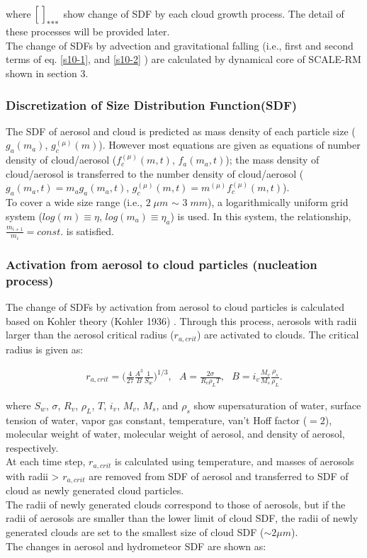where $\Bigl[\;\Bigr]_{***}$ show change of SDF by each cloud growth process. The detail of these processes will be provided later.\\
 The change of SDFs by advection and gravitational falling (i.e., first and second terms of eq. \ref{s10-1}, and \ref{s10-2}  ) are calculated by dynamical core of SCALE-RM shown in section 3.


\subsubsection{Discretization of Size Distribution Function(SDF)}
The SDF of aerosol and cloud is predicted as mass density of each particle size ($g_{a}(m_{a})$, $g_{c}^{(\mu)}(m)$). However most equations are given as equations of number density of cloud/aerosol ($f_{c}^{(\mu)}(m,t)$, $f_{a}(m_{a},t)$); the mass density of cloud/aerosol is transferred to the number density of cloud/aerosol ($g_{a}(m_{a},t)=m_{a}g_{a}(m_{a},t)$, $g_{c}^{(\mu)}(m,t)=m^{(\mu)}f_{c}^{(\mu)}(m,t)$).\\
To cover a wide size range (i.e., $2\;\mu m$ $\sim$ $3\;mm$), a logarithmically uniform grid system ($log(m)\equiv \eta$, $log(m_{a})\equiv \eta_{a}$) is used. In this system, the relationship, $\frac{m_{i+1}}{m_{i}}=const.$ is satisfied.

\subsubsection{Activation from aerosol to cloud particles (nucleation process)}
The change of SDFs by activation from aerosol to cloud particles is calculated based on Kohler theory (Kohler 1936) \cite{kohler_1936}. Through this process, aerosols with radii larger than the aerosol critical radius ($r_{a,crit}$) are activated to clouds. The critical radius is given as:

\begin{eqnarray}
r_{a,crit}=\bigl( \frac{4}{27}\frac{A^{3}}{B}\frac{1}{S_{w}}\Bigr )^{1/3}, \:\:\:A=\frac{2\sigma}{R_{v}\rho_{L}T},\:\:\: B=i_{v}\frac{M_{v}}{M_{s}}\frac{\rho_{s}}{\rho_{L}}.\label{s10-3}
\end{eqnarray}

where $S_{w}$, $\sigma$, $R_{v}$, $\rho_{L}$, $T$, $i_{v}$, $M_{v}$, $M_{s}$, and $\rho_{s}$ show supersaturation of water, surface tension of water, vapor gas constant, temperature, van't Hoff factor ($=2$), molecular weight of water, molecular weight of aerosol, and density of aerosol, respectively.\\
At each time step, $r_{a,crit}$ is calculated using temperature, and masses of aerosols with radii > $r_{a,crit}$ are removed from SDF of aerosol and 
transferred to SDF of cloud as newly generated cloud particles.\\
The radii of newly generated clouds correspond to those of aerosols, but if the radii of aerosols are smaller than the lower limit of cloud SDF, the radii of newly generated clouds are set to the smallest size of cloud SDF ($\sim 2 \mu m$).\\
The changes in aerosol and hydrometeor SDF are shown as:


